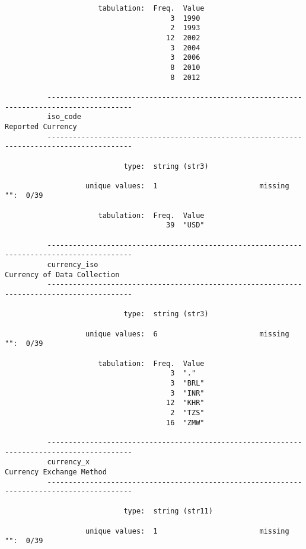 \documentclass{article}
\begin{document}
\begin{verbatim}
                      tabulation:  Freq.  Value
                                       3  1990
                                       2  1993
                                      12  2002
                                       3  2004
                                       3  2006
                                       8  2010
                                       8  2012
          
          ------------------------------------------------------------------------------------------
          iso_code                                                                 Reported Currency
          ------------------------------------------------------------------------------------------
          
                            type:  string (str3)
          
                   unique values:  1                        missing "":  0/39
          
                      tabulation:  Freq.  Value
                                      39  "USD"
          
          ------------------------------------------------------------------------------------------
          currency_iso                                                   Currency of Data Collection
          ------------------------------------------------------------------------------------------
          
                            type:  string (str3)
          
                   unique values:  6                        missing "":  0/39
          
                      tabulation:  Freq.  Value
                                       3  "."
                                       3  "BRL"
                                       3  "INR"
                                      12  "KHR"
                                       2  "TZS"
                                      16  "ZMW"
          
          ------------------------------------------------------------------------------------------
          currency_x                                                        Currency Exchange Method
          ------------------------------------------------------------------------------------------
          
                            type:  string (str11)
          
                   unique values:  1                        missing "":  0/39
          

\end{verbatim}
\end{document}
